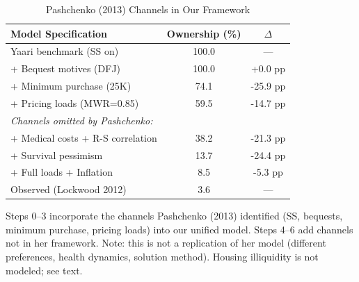 \begin{table}[htbp]
\centering
\caption{Pashchenko (2013) Channels in Our Framework}
\label{tab:pashchenko}
\begin{tabular}{lcc}
\toprule
Model Specification & Ownership (\%) & $\Delta$ \\
\midrule
Yaari benchmark (SS on) & 100.0 & --- \\
+ Bequest motives (DFJ) & 100.0 & +0.0 pp \\
+ Minimum purchase (25K) & 74.1 & -25.9 pp \\
+ Pricing loads (MWR=0.85) & 59.5 & -14.7 pp \\
\midrule
\textit{Channels omitted by Pashchenko:} & & \\
+ Medical costs + R-S correlation & 38.2 & -21.3 pp \\
+ Survival pessimism & 13.7 & -24.4 pp \\
+ Full loads + Inflation & 8.5 & -5.3 pp \\
\midrule
Observed (Lockwood 2012) & 3.6 & --- \\
\bottomrule
\end{tabular}
\begin{tablenotes}
\small
\item Steps 0--3 incorporate the channels Pashchenko (2013) identified
(SS, bequests, minimum purchase, pricing loads) into our unified model.
Steps 4--6 add channels not in her framework. Note: this is not a
replication of her model (different preferences, health dynamics,
solution method). Housing illiquidity is not modeled; see text.
\end{tablenotes}
\end{table}
